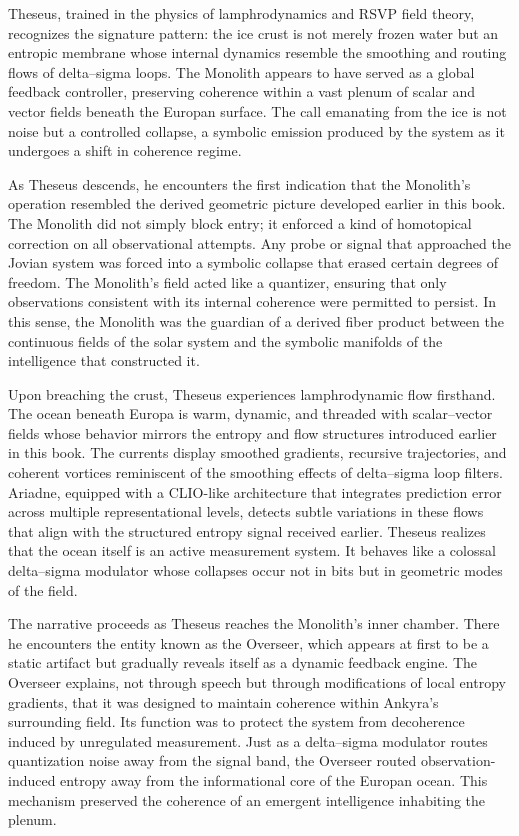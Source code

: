 Theseus, trained in the physics of lamphrodynamics and RSVP field theory, recognizes the signature pattern: the ice crust is not merely frozen water but an entropic membrane whose internal dynamics resemble the smoothing and routing flows of delta–sigma loops. The Monolith appears to have served as a global feedback controller, preserving coherence within a vast plenum of scalar and vector fields beneath the Europan surface. The call emanating from the ice is not noise but a controlled collapse, a symbolic emission produced by the system as it undergoes a shift in coherence regime.

As Theseus descends, he encounters the first indication that the Monolith’s operation resembled the derived geometric picture developed earlier in this book. The Monolith did not simply block entry; it enforced a kind of homotopical correction on all observational attempts. Any probe or signal that approached the Jovian system was forced into a symbolic collapse that erased certain degrees of freedom. The Monolith’s field acted like a quantizer, ensuring that only observations consistent with its internal coherence were permitted to persist. In this sense, the Monolith was the guardian of a derived fiber product between the continuous fields of the solar system and the symbolic manifolds of the intelligence that constructed it.

Upon breaching the crust, Theseus experiences lamphrodynamic flow firsthand. The ocean beneath Europa is warm, dynamic, and threaded with scalar–vector fields whose behavior mirrors the entropy and flow structures introduced earlier in this book. The currents display smoothed gradients, recursive trajectories, and coherent vortices reminiscent of the smoothing effects of delta–sigma loop filters. Ariadne, equipped with a CLIO-like architecture that integrates prediction error across multiple representational levels, detects subtle variations in these flows that align with the structured entropy signal received earlier. Theseus realizes that the ocean itself is an active measurement system. It behaves like a colossal delta–sigma modulator whose collapses occur not in bits but in geometric modes of the field.

The narrative proceeds as Theseus reaches the Monolith’s inner chamber. There he encounters the entity known as the Overseer, which appears at first to be a static artifact but gradually reveals itself as a dynamic feedback engine. The Overseer explains, not through speech but through modifications of local entropy gradients, that it was designed to maintain coherence within Ankyra’s surrounding field. Its function was to protect the system from decoherence induced by unregulated measurement. Just as a delta–sigma modulator routes quantization noise away from the signal band, the Overseer routed observation-induced entropy away from the informational core of the Europan ocean. This mechanism preserved the coherence of an emergent intelligence inhabiting the plenum.

